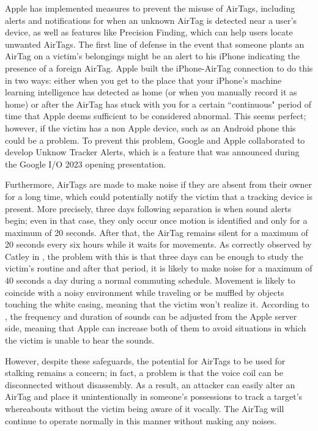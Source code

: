 \documentclass[english]{article}
\begin{document}
Apple has implemented measures to prevent the misuse of AirTags, including alerts and notifications for when an unknown AirTag is detected near a user's device, as well as features like Precision Finding, which can help users locate unwanted AirTags. The first line of defense in the event that someone plants an AirTag on a victim's belongings might be an alert to his iPhone indicating the presence of a foreign AirTag. Apple built the iPhone-AirTag connection to do this in two ways: either when you get to the place that your iPhone's machine learning intelligence has detected as home (or when you manually record it as home) or after the AirTag has stuck with you for a certain ``continuous" period of time that Apple deems sufficient to be considered abnormal. This seems perfect; however, if the victim has a non Apple device, such as an Android phone this could be a problem. To prevent this problem, Google and Apple collaborated to develop Unknow Tracker Alerts, which is a feature that was announced during the Google I/O 2023 opening presentation.

Furthermore, AirTags are made to make noise if they are absent from their owner for a long time, which could potentially notify the victim that a tracking device is present. More precisely, three days following separation is when sound alerts begin; even in that case, they only occur once motion is identified and only for a maximum of 20 seconds. After that, the AirTag remains silent for a maximum of 20 seconds every six hours while it waits for movements. As correctly observed by Catley in \cite{reverse}, the problem with this is that three days can be enough to study the victim's routine and after that period, it is likely to make noise for a maximum of 40 seconds a day during a normal commuting schedule. Movement is likely to coincide with a noisy environment while traveling or be muffled by objects touching the white casing, meaning that the victim won't realize it. According to \cite{server}, the frequency and duration of sounds can be adjusted from the Apple server side, meaning that Apple can increase both of them to avoid situations in which the victim is unable to hear the sounds.

However, despite these safeguards, the potential for AirTags to be used for stalking remains a concern; in fact, a problem is that the voice coil can be disconnected without disassembly. As a result, an attacker can easily alter an AirTag and place it unintentionally in someone's possessions to track a target's whereabouts without the victim being aware of it vocally. The AirTag will continue to operate normally in this manner without making any noises.
\end{document}
